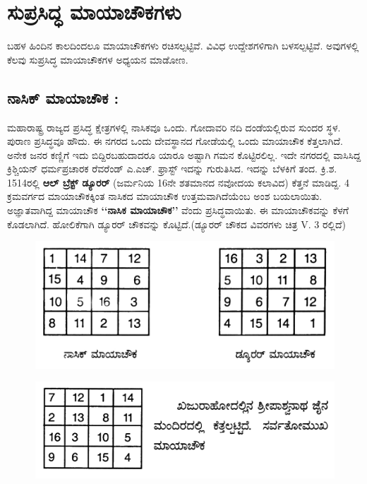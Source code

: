 \chapter{ಸುಪ್ರಸಿದ್ಧ ಮಾಯಾಚೌಕಗಳು}

ಬಹಳ ಹಿಂದಿನ ಕಾಲದಿಂದಲೂ ಮಾಯಾಚೌಕಗಳು ರಚಿಸಲ್ಪಟ್ಟಿವೆ. ವಿವಿಧ ಉದ್ದೇಶಗಳಿಗಾಗಿ ಬಳಸಲ್ಪಟ್ಟಿವೆ. ಅವುಗಳಲ್ಲಿ ಕೆಲವು ಸುಪ್ರಸಿದ್ಧ ಮಾಯಾಚೌಕಗಳ ಅಧ್ಯಯನ ಮಾಡೋಣ.

\section*{ನಾಸಿಕ್ ಮಾಯಾಚೌಕ :}

ಮಹಾರಾಷ್ಟ್ರ ರಾಜ್ಯದ ಪ್ರಸಿದ್ಧ ಕ್ಷೇತ್ರಗಳಲ್ಲಿ ನಾಸಿಕವೂ ಒಂದು. ಗೋದಾವರಿ ನದಿ ದಂಡೆಯಲ್ಲಿರುವ ಸುಂದರ ಸ್ಥಳ. ಪುರಾಣ ಪ್ರಸಿದ್ಧವೂ ಹೌದು. ಈ ನಗರದ ಒಂದು ದೇವಸ್ಥಾನದ ಗೋಡೆಯಲ್ಲಿ ಒಂದು ಮಾಯಾಚೌಕ ಕೆತ್ತಲಾಗಿದೆ. ಅನೇಕ ಜನರ ಕಣ್ಣಿಗೆ ಇದು ಬಿದ್ದಿರಬಹುದಾದರೂ ಯಾರೂ ಅಷ್ಟಾಗಿ ಗಮನ ಕೊಟ್ಟಿರಲಿಲ್ಲ. ಇದೇ ನಗರದಲ್ಲಿ ವಾಸಿಸಿದ್ದ ಕ್ರಿಶ್ಚಿಯನ್ ಧರ್ಮಪ್ರಚಾರಕ ರೆವರೆಂಡ್ ಎ.ಎಚ್. ಫ್ರಾಸ್ಟ್ ಇದನ್ನು ಗುರುತಿಸಿದ. ಇದನ್ನು ಬೆಳಕಿಗೆ ತಂದ. ಕ್ರಿ.ಶ. 1514ರಲ್ಲಿ \textbf{ಆಲ್ ಬ್ರೆಕ್ಟ್ ಡ್ಯೂರರ್} (ಜರ್ಮನಿಯ 16ನೇ ಶತಮಾನದ ನವೋದಯ ಕಲಾವಿದ) ಕೆತ್ತನೆ ಮಾಡಿದ್ದ. 4 ಕ್ರಮವರ್ಗದ ಮಾಯಾಚೌಕಕ್ಕಿಂತ ನಾಸಿಕದ ಮಾಯಾಚೌಕ ಉತ್ತಮವಾಗಿದೆಯೆಂಬ ಅಂಶ ಬಯಲಾಯಿತು. ಅಜ್ಞಾತವಾಗಿದ್ದ ಮಾಯಾಚೌಕ \textbf{‘‘ನಾಸಿಕ ಮಾಯಾಚೌಕ’’} ವೆಂದು ಪ್ರಸಿದ್ಧವಾಯಿತು. ಈ ಮಾಯಾಚೌಕವನ್ನು ಕೆಳಗೆ ಕೊಡಲಾಗಿದೆ. ಹೋಲಿಕೆಗಾಗಿ ಡ್ಯೂರರ್ ಚೌಕವನ್ನು ಕೊಟ್ಟಿದೆ.(ಡ್ಯೂರರ್ ಚೌಕದ ವಿವರಗಳು ಚಿತ್ರ V. 3 ರಲ್ಲಿದೆ)
\begin{figure}[h]
\includegraphics{src/figures/chap4/fig4.1.jpg}
\end{figure}
\begin{figure}[h]
\includegraphics{src/figures/chap4/fig4.2.jpg}
\end{figure}

